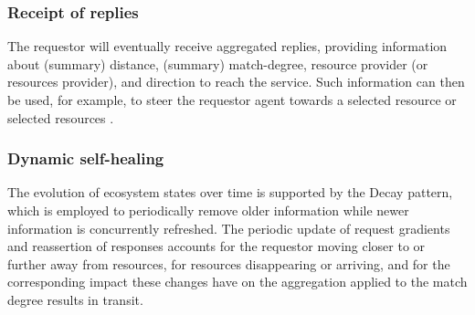 \documentclass[12pt,a4paper,twoside,openright]{book}
\begin{document}
\subsubsection{Receipt of replies}
The requestor will eventually receive aggregated replies, providing information about (summary) distance, (summary) match-degree, resource provider (or resources provider), and direction to reach the service.
%
Such information can then be used, for example, to steer the requestor agent towards a selected resource or selected resources \cite{sapereecolaws-sac2012}.

\subsubsection{Dynamic self-healing}
The evolution of ecosystem states over time is supported by the Decay pattern, which is employed to periodically remove older information while newer information is concurrently refreshed.
%
The periodic update of request gradients and reassertion of responses accounts for the requestor moving closer to or further away from resources, for resources disappearing or arriving, and for the corresponding impact these changes have on the aggregation applied to the match degree results in transit. 
\end{document}
